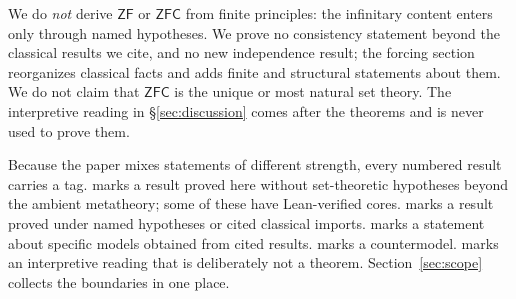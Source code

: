 We do \emph{not} derive $\mathsf{ZF}$ or $\mathsf{ZFC}$ from finite principles: the infinitary
content enters only through named hypotheses. We prove no consistency statement beyond the
classical results we cite, and no new independence result; the forcing section reorganizes
classical facts and adds finite and structural statements about them. We do not claim that
$\mathsf{ZFC}$ is the unique or most natural set theory. The interpretive reading in
\S\ref{sec:discussion} comes after the theorems and is never used to prove them.

Because the paper mixes statements of different strength, every numbered result carries a tag.
\inhouse{} marks a result proved here without set-theoretic hypotheses beyond the ambient
metatheory; some of these have Lean-verified cores. \condg{} marks a result proved under named
hypotheses or cited classical imports. \modelg{} marks a statement about specific models obtained
from cited results. \guardg{} marks a countermodel. \metag{} marks an interpretive reading that is
deliberately not a theorem. Section~\ref{sec:scope} collects the boundaries in one place.
